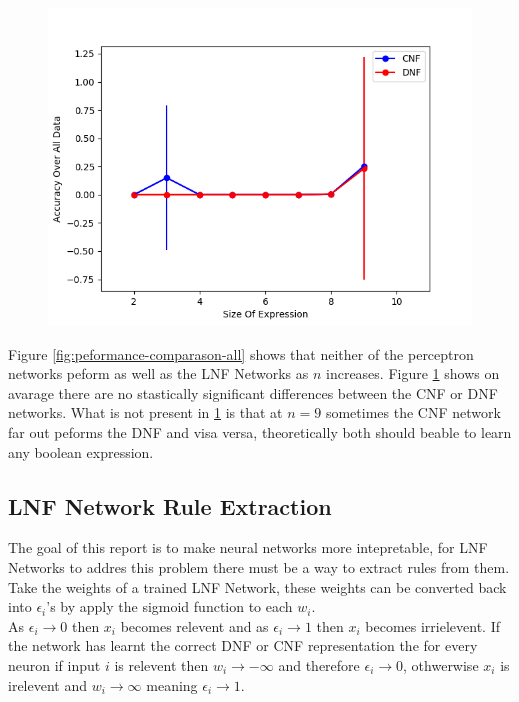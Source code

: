 \begin{figure}[H]
  \centering
  \begin{minipage}[b]{0.8\textwidth}
    \includegraphics[width=\textwidth]{CNFvsDNF.png}
    \caption{}
    \label{fig:peformance-comparason-cnfdnf}
  \end{minipage}
  \hfill
\end{figure}

Figure  \ref{fig:peformance-comparason-all} shows that neither of the perceptron networks peform as well as the LNF Networks as $n$ increases. Figure  \ref{fig:peformance-comparason-cnfdnf} shows on avarage there are no stastically significant differences between the CNF or DNF networks. What is not present in  \ref{fig:peformance-comparason-cnfdnf} is that at $n = 9$ sometimes the CNF network far out peforms the DNF and visa versa, theoretically both should beable to learn any boolean expression. 

\subsection{LNF Network Rule Extraction}
The goal of this report is to make neural networks more intepretable, for LNF Networks to addres this problem there must be a way to extract rules from them. Take the weights of a trained LNF Network, these weights can be converted back into $\epsilon_i$'s by apply the sigmoid function to each $w_i$.\\

As $\epsilon_i \rightarrow 0$ then $x_i$ becomes relevent and as $\epsilon_i \rightarrow 1$ then $x_i$ becomes irrielevent. If the network has learnt the correct DNF or CNF representation the for every neuron if input $i$ is relevent then $w_i \rightarrow -\infty$ and therefore $\epsilon_i \rightarrow 0$, othwerwise $x_i$ is irelevent and  $w_i \rightarrow \infty$ meaning $\epsilon_i \rightarrow 1$.\\

